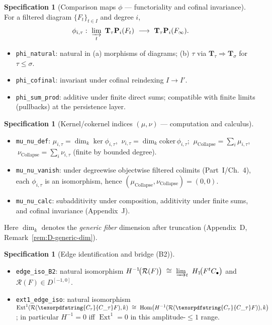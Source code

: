 \documentclass[11pt]{article}
\numberwithin{equation}{section}
\theoremstyle{plain}
\theoremstyle{definition}
\theoremstyle{remark}
\DeclareMathOperator{\Ext}{Ext}
\DeclareMathOperator{\Hom}{Hom}
\newcommand{\Rfun}{\mathcal{R}}
\theoremstyle{plain}
\theoremstyle{definition}
\numberwithin{equation}{section}
\theoremstyle{definition}
\newtheorem{specification}[theorem]{Specification}
\DeclareRobustCommand{\Ctau}{\texorpdfstring{\ensuremath{C_{\tau}}}{C\_\tau}}
\DeclareRobustCommand{\muc}{\mu_{\mathrm{Collapse}}}
\DeclareRobustCommand{\nuc}{\nu_{\mathrm{Collapse}}}
\numberwithin{equation}{section}
\theoremstyle{plain}
\theoremstyle{definition}
\theoremstyle{remark}
\providecommand{\Cfun}[1]{\mathsf{C}_{#1}}
\providecommand{\Ctau}{\Cfun{\tau}}
\providecommand{\muc}{\mu_{\mathrm{Collapse}}}
\providecommand{\nuc}{\nu_{\mathrm{Collapse}}}
\begin{document}
\begin{specification}[Comparison maps $\phi$ — functoriality and cofinal invariance]
For a filtered diagram $\{F_t\}_{t\in I}$ and degree $i$,
\[
\phi_{i,\tau}:\ \varinjlim_{t}\ \mathbf{T}_\tau\mathbf{P}_i(F_t)\ \longrightarrow\ \mathbf{T}_\tau\mathbf{P}_i(F_\infty).
\]
\begin{itemize}
  \item \texttt{phi\_natural}: natural in (a) morphisms of diagrams; (b) $\tau$ via $\mathbf{T}_\tau\Rightarrow \mathbf{T}_\sigma$ for $\tau\le \sigma$.
  \item \texttt{phi\_cofinal}: invariant under cofinal reindexing $I\to I'$.
  \item \texttt{phi\_sum\_prod}: additive under finite direct sums; compatible with finite limits (pullbacks) at the persistence layer.
\end{itemize}
\end{specification}

\begin{specification}[Kernel/cokernel indices $(\mu,\nu)$ — computation and calculus]
\begin{itemize}
  \item \texttt{mu\_nu\_def}: $\mu_{i,\tau}=\dim_k\ker\phi_{i,\tau}$, $\ \nu_{i,\tau}=\dim_k\mathrm{coker}\,\phi_{i,\tau}$; $\ \muc=\sum_i\mu_{i,\tau}$, $\ \nuc=\sum_i\nu_{i,\tau}$ (finite by bounded degree).
  \item \texttt{mu\_nu\_vanish}: under degreewise objectwise filtered colimits (Part~I/Ch.~4), each $\phi_{i,\tau}$ is an isomorphism, hence $(\muc,\nuc)=(0,0)$.
  \item \texttt{mu\_nu\_calc}: subadditivity under composition, additivity under finite sums, and cofinal invariance (Appendix~J).
\end{itemize}
Here $\dim_k$ denotes the \emph{generic fiber} dimension after truncation (Appendix~D, Remark~\ref{rem:D-generic-dim}).
\end{specification}

\begin{specification}[Edge identification and bridge (B2)]
\begin{itemize}
  \item \texttt{edge\_iso\_B2}: natural isomorphism $H^{-1}\!\big(\Rfun(F)\big)\ \cong\ \varinjlim_{t}\ H_1\!\big(F^{t}C_\bullet\big)$ and $\Rfun(F)\in D^{[-1,0]}$.
  \item \texttt{ext1\_edge\_iso}: natural isomorphism $\Ext^1(\Rfun(\Ctau F),k)\ \cong\ \Hom\!\big(H^{-1}(\Rfun(\Ctau F)),k\big)$; in particular $H^{-1}=0$ iff $\Ext^1=0$ in this amplitude-$\le 1$ range.
\end{itemize}
\end{specification}
\end{document}
